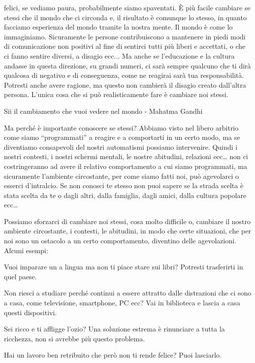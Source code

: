 \documentclass[12pt]{book} %
\begin{document}
felici, se vediamo paura, probabilmente siamo spaventati. È più facile cambiare se stessi che il mondo che ci circonda
e, il risultato è comunque lo stesso, in quanto facciamo esperienza del mondo tramite la nostra mente. Il mondo è come
lo immaginiamo. Sicuramente le persone contribuiscono a mantenere in piedi modi di comunicazione non positivi al fine
di sentirci tutti più liberi e accettati, o che ci fanno sentire diversi, a disagio ecc... Ma anche se l'educazione e
la cultura andasse in questa direzione, su grandi numeri, ci sarà sempre qualcuno che ti dirà qualcosa di negativo e di
conseguenza, come ne reagirai sarà tua responsabilità. Potresti anche avere ragione, ma questo non cambierà il disagio
creato dall'altra persona. L'unica cosa che si può realisticamente fare è cambiare noi stessi.

Sii il cambiamento che vuoi vedere nel mondo - Mahatma Gandhi


\bigskip

Ma perché è importante conoscere se stessi? Abbiamo visto nel libero arbitrio come siamo “programmati” a reagire e a
comportarti in un certo modo, ma se diventiamo consapevoli del nostri automatismi possiamo intervenire. Quindi i nostri
contesti, i nostri schermi mentali, le nostre abitudini, relazioni ecc… non ci costringeranno ad avere il relativo
comportamento a cui siamo programmati, ma sicuramente l'ambiente circostante, per come siamo fatti
noi, può agevolarci o esserci d'intralcio. Se non conosci te stesso non puoi sapere se la strada
scelta è stata scelta da te o dagli altri, dalla famiglia, dagli amici, dalla cultura popolare ecc…

Possiamo sforzarci di cambiare noi stessi, cosa molto difficile o, cambiare il nostro ambiente circostante, i contesti,
le abitudini, in modo che certe situazioni, che per noi sono un ostacolo a un certo comportamento, diventino delle
agevolazioni. Alcuni esempi:

Vuoi imparare un a lingua ma non ti piace stare sui libri? Potresti trasferirti in quel paese.

Non riesci a studiare perché continui a essere attratto dalle distrazioni che ci sono a casa, come televisione,
smartphone, PC ecc? Vai in biblioteca e lascia a casa questi dispositivi.

Sei ricco e ti affligge l'ozio? Una soluzione estrema è rinunciare a tutta la ricchezza, non si
avrebbe più questo problema. 

Hai un lavoro ben retribuito che però non ti rende felice? Puoi lasciarlo.
\end{document}
